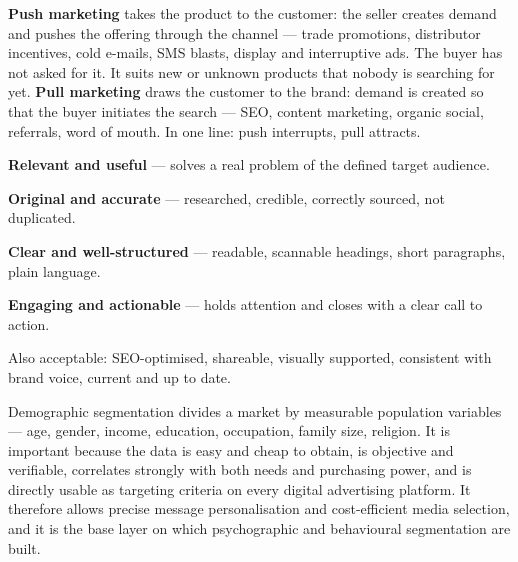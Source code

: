 \begin{qlist}

\textbf{Push marketing} takes the product to the customer: the seller creates
demand and pushes the offering through the channel --- trade promotions,
distributor incentives, cold e-mails, SMS blasts, display and interruptive ads.
The buyer has not asked for it. It suits new or unknown products that nobody is
searching for yet.
\textbf{Pull marketing} draws the customer to the brand: demand is created so
that the buyer initiates the search --- SEO, content marketing, organic social,
referrals, word of mouth. In one line: push interrupts, pull attracts.

\begin{apts}
\item \textbf{Relevant and useful} --- solves a real problem of the defined
      target audience.
\item \textbf{Original and accurate} --- researched, credible, correctly
      sourced, not duplicated.
\item \textbf{Clear and well-structured} --- readable, scannable headings,
      short paragraphs, plain language.
\item \textbf{Engaging and actionable} --- holds attention and closes with a
      clear call to action.
\end{apts}
Also acceptable: SEO-optimised, shareable, visually supported, consistent with
brand voice, current and up to date.

Demographic segmentation divides a market by measurable population variables
--- age, gender, income, education, occupation, family size, religion. It is
important because the data is easy and cheap to obtain, is objective and
verifiable, correlates strongly with both needs and purchasing power, and is
directly usable as targeting criteria on every digital advertising platform. It
therefore allows precise message personalisation and cost-efficient media
selection, and it is the base layer on which psychographic and behavioural
segmentation are built.


\end{qlist}
